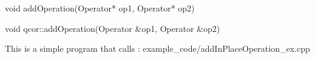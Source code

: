 
\begin{apidefinition}

\begin{Csynopsis}
    void addOperation(Operator* op1, Operator* op2)
\end{Csynopsis}

\begin{Cppsynopsis}
    void qcor::addOperation(Operator &op1, Operator &op2)
\end{Cppsynopsis}


\begin{apiarguments}
\end{apiarguments}



\apinotes{
    
}

\begin{apiexamples}

\apicppexample
    { This is a simple program that calls : } 
    { example_code/addInPlaceOperation_ex.cpp} 
    {}

\end{apiexamples}

\end{apidefinition}
